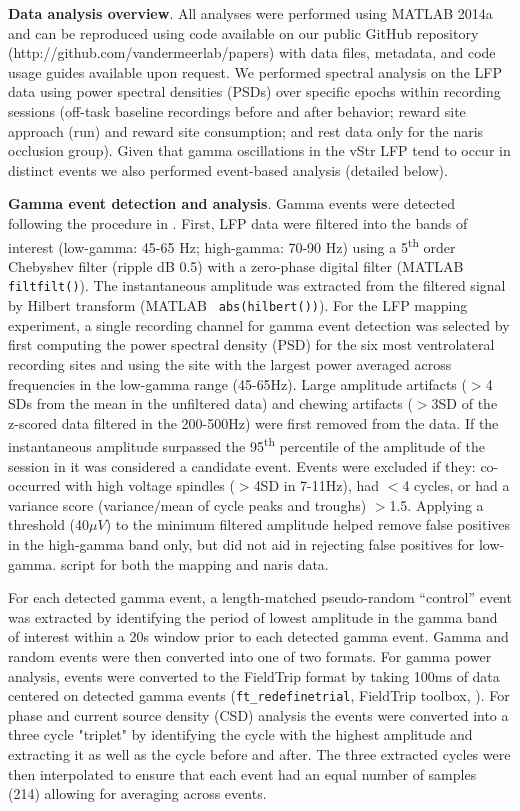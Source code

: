 \documentclass[11pt]{article}
\let\cite=\citep
\let\citeNP=\citealt
\begin{document}
{\bf Data analysis overview}.  All analyses were performed using
MATLAB 2014a and can be reproduced using code available on our public
GitHub repository (http://github.com/vandermeerlab/papers) with data
files, metadata, and code usage guides available upon request. We
performed spectral analysis on the LFP data using power spectral
densities (PSDs) over specific epochs within recording sessions
(off-task baseline recordings before and after behavior; reward site
approach (run) and reward site consumption; and rest data only for the
naris occlusion group). Given that gamma oscillations in the vStr LFP
tend to occur in distinct events
\cite{masimore05,Cohen2009d,Donnelly2014} we also performed
event-based analysis (detailed below).

{\bf Gamma event detection and analysis}. Gamma events were detected
following the procedure in \citeNP{Catanese2016}. First, LFP data were
filtered into the bands of interest (low-gamma: 45-65 Hz; high-gamma:
70-90 Hz) using a 5\textsuperscript{th} order Chebyshev filter (ripple
dB 0.5) with a zero-phase digital filter (MATLAB {\tt
  filtfilt()}). The instantaneous amplitude was extracted from the
filtered signal by Hilbert transform (MATLAB {\tt
  abs(hilbert())}). For the LFP mapping experiment, a single recording
channel for gamma event detection was selected by first computing the
power spectral density (PSD) for the six most ventrolateral recording
sites and using the site with the largest power averaged across
frequencies in the low-gamma range (45-65Hz). Large amplitude
artifacts ($>$4 SDs from the mean in the unfiltered data) and chewing
artifacts ($>$3SD of the z-scored data filtered in the 200-500Hz) were
first removed from the data. If the instantaneous amplitude surpassed
the 95\textsuperscript{th} percentile of the amplitude of the session
in it was considered a candidate event. Events were excluded if they:
co-occurred with high voltage spindles ($>$4SD in 7-11Hz), had $<$4
cycles, or had a variance score (variance$/$mean of cycle peaks and
troughs) $>$1.5.  Applying a threshold (40$\mu V$) to the minimum
filtered amplitude helped remove false positives in the high-gamma
band only, but did not aid in rejecting false positives for low-gamma.
script for both the mapping and naris data.

For each detected gamma event, a length-matched pseudo-random
``control'' event was extracted by identifying the period of lowest
amplitude in the gamma band of interest within a 20s window prior to
each detected gamma event. Gamma and random events were then converted
into one of two formats.  For gamma power analysis, events were
converted to the FieldTrip format by taking 100ms of data centered on
detected gamma events ({\tt ft\_redefinetrial}, FieldTrip toolbox,
\citeNP{Oostenveld2011}). For phase and current source density (CSD)
analysis the events were converted into a three cycle "triplet" by
identifying the cycle with the highest amplitude and extracting it as
well as the cycle before and after.  The three extracted cycles were
then interpolated to ensure that each event had an equal number of
samples (214) allowing for averaging across events.
\end{document}
